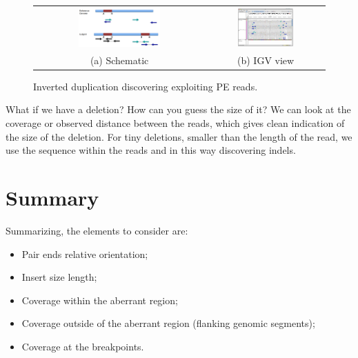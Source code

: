 \begin{figure}[H]
\begin{tabular}{cc}
  \includegraphics[width=0.5\textwidth]{inverted.png} &   \includegraphics[width=0.5\textwidth]{inverted_igv.png} \\
(a) Schematic & (b) IGV view \\[6pt]
\end{tabular}
\caption{Inverted duplication discovering exploiting PE reads.}
\label{fig:inverted}
\end{figure}

What if we have a deletion? How can you guess the size of it? We can look at the coverage or observed distance between the reads, which gives clean indication of the size of the deletion. For tiny deletions, smaller than the length of the read, we use the sequence within the reads and in this way discovering indels.

\section{Summary}
Summarizing, the elements to consider are:
 \begin{itemize}
 \item Pair ends relative orientation;
 \item Insert size length;
\item Coverage within the aberrant region;
\item Coverage outside of the aberrant region (flanking genomic segments);
\item Coverage at the breakpoints.
 \end{itemize}
